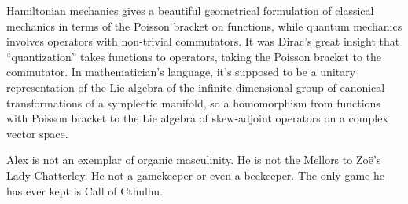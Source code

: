 Hamiltonian mechanics gives a beautiful geometrical formulation of classical mechanics in terms of the Poisson bracket on functions, while quantum mechanics involves operators with non-trivial commutators. It was Dirac’s great insight that “quantization” takes functions to operators, taking the Poisson bracket to the commutator. In mathematician’s language, it’s supposed to be a unitary representation of the Lie algebra of the infinite dimensional group of canonical transformations of a symplectic manifold, so a homomorphism from functions with Poisson bracket to the Lie algebra of skew-adjoint operators on a complex vector space.

\majorbreak
Alex is not an exemplar of organic masculinity. He is not the Mellors to Zoë's Lady Chatterley. He not a gamekeeper or even a beekeeper. The only game he has ever kept is {\twelvesl Call of Cthulhu}.
 \vfill\eject
